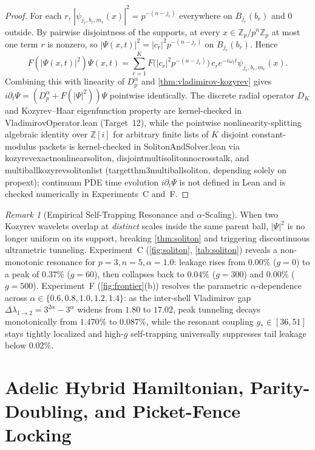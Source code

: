 \documentclass[11pt,a4paper]{article}
\numberwithin{equation}{section}
\theoremstyle{plain}
\theoremstyle{definition}
\theoremstyle{remark}
\newtheorem{remark}[theorem]{Remark}
\newcommand{\Z}{\mathbb{Z}}
\newcommand{\Zp}{\mathbb{Z}_p}
\newcommand{\Dp}{D_p^\alpha}
\newcommand{\code}[1]{{\ttfamily\footnotesize\def\_{\textunderscore\penalty0\hskip0pt}#1}}
\begin{document}
\begin{proof}
For each $r$, $|\psi_{j_r,b_r,m_r}(x)|^2 = p^{-(n-j_r)}$ everywhere on $B_{j_r}(b_r)$ and $0$ outside. By pairwise disjointness of the supports, at every $x \in \Zp/p^n\Zp$ at most one term $r$ is nonzero, so $|\Psi(x,t)|^2 = |c_r|^2 p^{-(n-j_r)}$ on $B_{j_r}(b_r)$. Hence
\[
  F(|\Psi(x,t)|^2)\Psi(x,t) = \sum_{r=1}^K F\!\bigl(|c_r|^2 p^{-(n-j_r)}\bigr)\, c_r e^{-i\omega_r t}\psi_{j_r,b_r,m_r}(x).
\]
Combining this with linearity of $\Dp$ and \cref{thm:vladimirov-kozyrev} gives $i\partial_t \Psi = (\Dp + F(|\Psi|^2))\Psi$ pointwise identically. The discrete radial operator $D_K$ and Kozyrev--Haar eigenfunction property are kernel-checked in \code{VladimirovOperator.lean} (Target~12), while the pointwise nonlinearity-splitting algebraic identity over $\Z[i]$ for arbitrary finite lists of $K$ disjoint constant-modulus packets is kernel-checked in \code{SolitonAndSolver.lean} via \code{kozyrev\_exact\_nonlinear\_soliton}, \code{disjoint\_multi\_soliton\_no\_crosstalk}, and \code{multi\_ball\_kozyrev\_soliton\_list} (\code{target\_thm3\_multiball\_soliton}, depending solely on \code{propext}); continuum PDE time evolution $i\partial_t\Psi$ is not defined in Lean and is checked numerically in Experiments~C and~F.
\end{proof}

\begin{remark}[Empirical Self-Trapping Resonance and $\alpha$-Scaling]
When two Kozyrev wavelets overlap at \emph{distinct} scales inside the same parent ball, $|\Psi|^2$ is no longer uniform on its support, breaking \cref{thm:soliton} and triggering discontinuous ultrametric tunneling. Experiment~C (\cref{fig:soliton}, \cref{tab:soliton}) reveals a non-monotonic resonance for $p=3, n=5, \alpha=1.0$: leakage rises from $0.00\%$ ($g=0$) to a peak of $0.37\%$ ($g=60$), then collapses back to $0.04\%$ ($g=300$) and $0.00\%$ ($g=500$). Experiment~F (\cref{fig:frontier}(b)) resolves the parametric $\alpha$-dependence across $\alpha \in \{0.6, 0.8, 1.0, 1.2, 1.4\}$: as the inter-shell Vladimirov gap $\Delta\lambda_{1\to 2} = 3^{2\alpha} - 3^\alpha$ widens from $1.80$ to $17.02$, peak tunneling decays monotonically from $1.470\%$ to $0.087\%$, while the resonant coupling $g_* \in [36, 51]$ stays tightly localized and high-$g$ self-trapping universally suppresses tail leakage below $0.02\%$.
\end{remark}

\section[Adelic Hybrid Hamiltonian and Modular Picket-Fence Locking]{Adelic Hybrid Hamiltonian, Parity-Doubling, and Picket-Fence Locking}
\label{sec:adelic}
\end{document}

